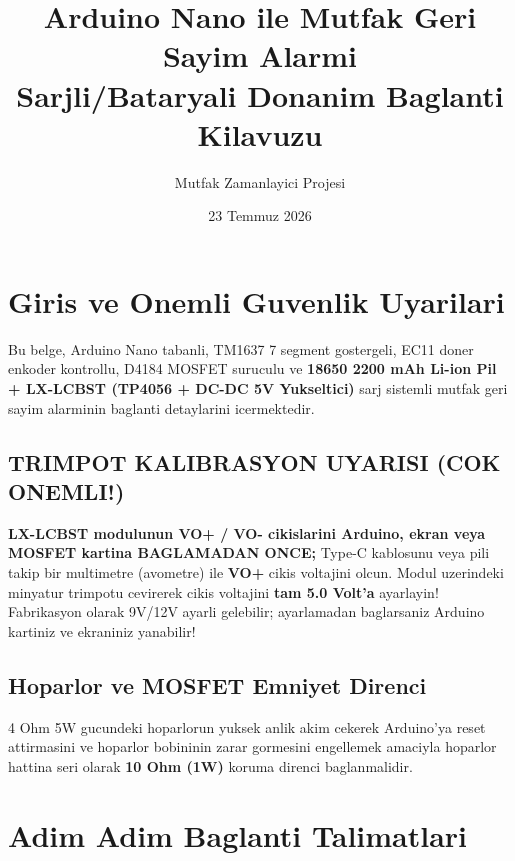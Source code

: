 \documentclass[12pt,a4paper]{article}
\title{Arduino Nano ile Mutfak Geri Sayim Alarmi\\Sarjli/Bataryali Donanim Baglanti Kilavuzu}
\author{Mutfak Zamanlayici Projesi}
\date{23 Temmuz 2026}
\begin{document}
\maketitle

\section{Giris ve Onemli Guvenlik Uyarilari}
Bu belge, Arduino Nano tabanli, TM1637 7 segment gostergeli, EC11 doner enkoder kontrollu, D4184 MOSFET suruculu ve \textbf{18650 2200 mAh Li-ion Pil + LX-LCBST (TP4056 + DC-DC 5V Yukseltici)} sarj sistemli mutfak geri sayim alarminin baglanti detaylarini icermektedir.

\subsection{TRIMPOT KALIBRASYON UYARISI (COK ONEMLI!)}
\textbf{LX-LCBST modulunun VO+ / VO- cikislarini Arduino, ekran veya MOSFET kartina BAGLAMADAN ONCE;}
Type-C kablosunu veya pili takip bir multimetre (avometre) ile \textbf{VO+} cikis voltajini olcun. Modul uzerindeki minyatur trimpotu cevirerek cikis voltajini \textbf{tam 5.0 Volt'a} ayarlayin! Fabrikasyon olarak 9V/12V ayarli gelebilir; ayarlamadan baglarsaniz Arduino kartiniz ve ekraniniz yanabilir!

\subsection{Hoparlor ve MOSFET Emniyet Direnci}
4 Ohm 5W gucundeki hoparlorun yuksek anlik akim cekerek Arduino'ya reset attirmasini ve hoparlor bobininin zarar gormesini engellemek amaciyla hoparlor hattina seri olarak \textbf{10 Ohm (1W)} koruma direnci baglanmalidir.

\section{Adim Adim Baglanti Talimatlari}
\end{document}
